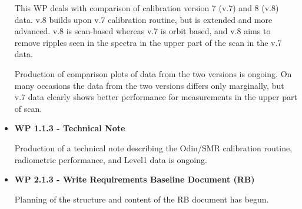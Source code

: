 \begin{itemize}
This WP deals with comparison of calibration version 7 (v.7) and 8 (v.8) data. 
v.8 builds upon v.7 calibration routine, but is extended and more advanced.
v.8 is scan-based whereas v.7 is orbit based, and v.8 aims to remove ripples
seen in the spectra in the upper part of the scan in the v.7 data.

Production of comparison plots of data from the two versions is ongoing.
On many occasions the data from the two versions differs only marginally,
but v.7 data clearly shows better performance for measurements
in the upper part of scan.

\item{\bf WP 1.1.3 - Technical Note}

Production of a technical note describing the Odin/SMR calibration
routine, radiometric performance, and Level1 data is ongoing.

\item{\bf WP 2.1.3 - Write Requirements Baseline Document (RB)}

Planning of the structure and content of the RB document has begun.

\end{itemize}
